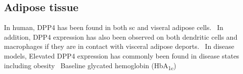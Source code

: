 \subsection{Adipose tissue}
In human, DPP4 has been found in both sc and viseral adipose cells.~\cite{Lamers2011} In addition, DPP4 expression has also been observed on both dendritic cells and macrophages if they are in contact with visceral adipose deports.~\cite{Zhong2013} In disease models, Elevated DPP4 expression has commonly been found in disease states including obesity~ Baseline glycated hemoglobin (HbA\textsubscript{1c}) 